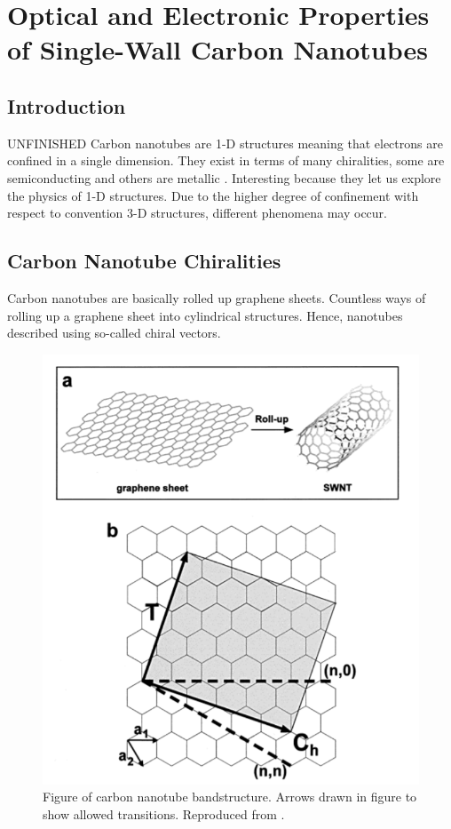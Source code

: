 \chapter{Optical and Electronic Properties of Single-Wall Carbon Nanotubes}

\section{Introduction}
{\color{red}UNFINISHED} Carbon nanotubes are 1-D structures meaning that electrons are confined in a single dimension. They exist in terms of many chiralities, some are semiconducting and others are metallic \cite{soavi2016ultrafast}. Interesting because they let us explore the physics of 1-D structures. Due to the higher degree of confinement with respect to convention 3-D structures, different phenomena may occur.



\section{Carbon Nanotube Chiralities}

Carbon nanotubes are basically rolled up graphene sheets. Countless ways of rolling up a graphene sheet into cylindrical structures. Hence, nanotubes described using so-called chiral vectors. 

\begin{figure}[H]
	\centering
	\includegraphics[scale=0.7]{images/chapter_optical_props/chiral_vectors.png}
	\caption{Figure of carbon nanotube bandstructure. Arrows drawn in figure to show allowed transitions. Reproduced from \cite{odom2000structure}.}
	\label{fig:chiral_vectors}
\end{figure}


